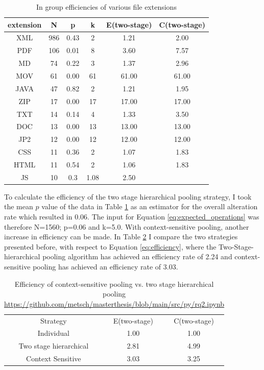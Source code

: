 \begin{table}[H]
    \caption{In group efficiencies of various file extensions}
    \centering
    \begin{tabular}{ c c c c c c}
    \label{tb:efficiency}
     extension & N & p & k & E(\acrshort{two-stage}) & C(\acrshort{two-stage}) \\
     \hline
     XML & 986 & 0.43 & 2 & 1.21  & 2.00 \\  
     \hline
     PDF &106 &0.01 & 8 &  3.60 & 7.57 \\
     \hline
     MD & 74 & 0.22  & 3 & 1.37 & 2.96 \\    
     \hline
     MOV&61 & 0.00 &  61 & 61.00 & 61.00 \\  
     \hline
     JAVA &47 &0.82 & 2  & 1.21 & 1.95 \\  
     \hline
     ZIP & 17 &0.00 &  17 & 17.00 & 17.00 \\
     \hline
     TXT & 14 & 0.14 &  4 & 1.33 & 3.50 \\ 
     \hline
     DOC & 13 & 0.00 &  13 & 13.00 & 13.00 \\   
     \hline
     JP2 & 12 & 0.00 &  12 & 12.00 & 12.00 \\   
     \hline
     CSS & 11 & 0.36 & 2  & 1.07 & 1.83 \\  
     \hline
     HTML & 11 & 0.54 &  2 & 1.06 & 1.83 \\   
     \hline
     JS & 10 & 0.3 & 1.08 & 2.50 
    \end{tabular}
\end{table}

To calculate the efficiency of the two stage hierarchical pooling strategy, I took the mean $p$ value of the data in Table \ref{tb:efficiency} as an estimator for the overall alteration rate which resulted in 0.06. The input for Equation \ref{eq:expected_operations} was therefore N=1560; p=0.06 and k=5.0.
With context-sensitive pooling, another increase in efficiency can be made. In Table \ref{tb:context-sensitive} I compare the two strategies presented before, with respect to Equation \ref{eq:efficiency}, where the Two-Stage-hierarchical pooling algorithm has achieved an efficiency rate of 2.24 and context-sensitive pooling has achieved an efficiency rate of 3.03. 
\begin{table}[H]
    \caption{Efficiency of context-sensitive pooling vs. two stage hierarchical pooling \url{https://github.com/metsch/masterthesis/blob/main/src/py/rq2.ipynb}}
    \centering
    \begin{tabular}{c c c}
    \label{tb:context-sensitive}
    Strategy & E(\acrshort{two-stage}) & C(\acrshort{two-stage}) \\
    Individual & 1.00 & 1.00 \\
    Two stage hierarchical &  2.81 & 4.99\\
    Context Sensitive & 3.03 & 3.25
    \end{tabular}
\end{table}

